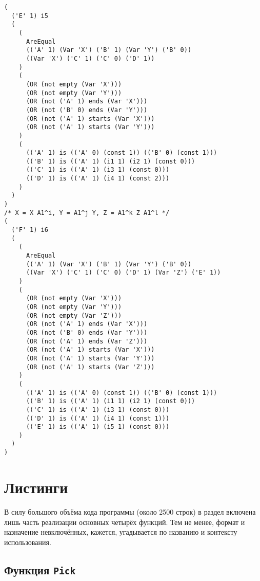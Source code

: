 \documentclass[12pt]{article}
\begin{document}
\begin{verbatim}
(
  ('E' 1) i5
  (
    (
      AreEqual
      (('A' 1) (Var 'X') ('B' 1) (Var 'Y') ('B' 0))
      ((Var 'X') ('C' 1) ('C' 0) ('D' 1))
    )
    (
      (OR (not empty (Var 'X')))
      (OR (not empty (Var 'Y')))
      (OR (not ('A' 1) ends (Var 'X')))
      (OR (not ('B' 0) ends (Var 'Y')))
      (OR (not ('A' 1) starts (Var 'X')))
      (OR (not ('A' 1) starts (Var 'Y')))
    )
    (
      (('A' 1) is (('A' 0) (const 1)) (('B' 0) (const 1)))
      (('B' 1) is (('A' 1) (i1 1) (i2 1) (const 0)))
      (('C' 1) is (('A' 1) (i3 1) (const 0)))
      (('D' 1) is (('A' 1) (i4 1) (const 2)))
    )
  )
)
/* X = X A1^i, Y = A1^j Y, Z = A1^k Z A1^l */
(
  ('F' 1) i6
  (
    (
      AreEqual
      (('A' 1) (Var 'X') ('B' 1) (Var 'Y') ('B' 0))
      ((Var 'X') ('C' 1) ('C' 0) ('D' 1) (Var 'Z') ('E' 1))
    )
    (
      (OR (not empty (Var 'X')))
      (OR (not empty (Var 'Y')))
      (OR (not empty (Var 'Z')))
      (OR (not ('A' 1) ends (Var 'X')))
      (OR (not ('B' 0) ends (Var 'Y')))
      (OR (not ('A' 1) ends (Var 'Z')))
      (OR (not ('A' 1) starts (Var 'X')))
      (OR (not ('A' 1) starts (Var 'Y')))
      (OR (not ('A' 1) starts (Var 'Z')))
    )
    (
      (('A' 1) is (('A' 0) (const 1)) (('B' 0) (const 1)))
      (('B' 1) is (('A' 1) (i1 1) (i2 1) (const 0)))
      (('C' 1) is (('A' 1) (i3 1) (const 0)))
      (('D' 1) is (('A' 1) (i4 1) (const 1)))
      (('E' 1) is (('A' 1) (i5 1) (const 0)))
    )
  )
)
\end{verbatim}



\section{Листинги} \label{code}

В силу большого объёма кода программы (около 2500 строк) в раздел включена
лишь часть реализации основных четырёх функций. Тем не менее, формат и
назначение невключённых, кажется, угадывается по названию и контексту
использования.

\subsection{Функция \texttt{Pick}}
\end{document}
